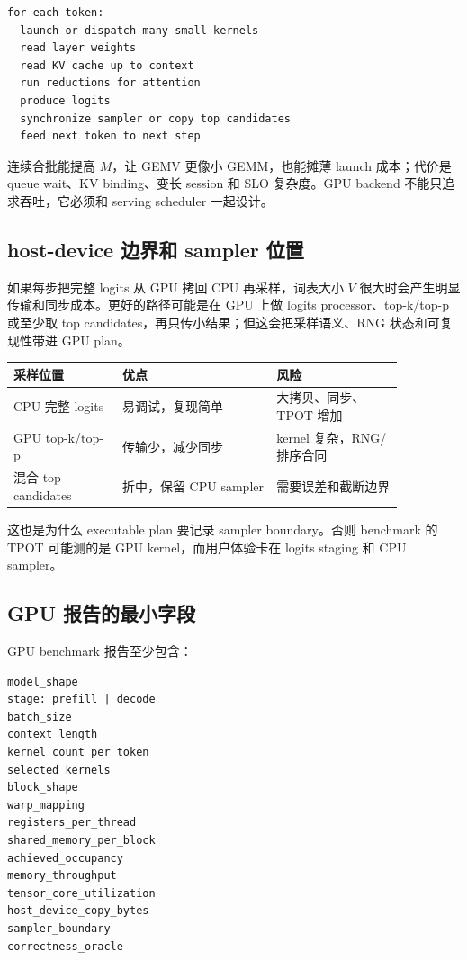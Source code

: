 \begin{lstlisting}[numbers=none,caption={单 session decode 的 GPU 固定成本}]
for each token:
  launch or dispatch many small kernels
  read layer weights
  read KV cache up to context
  run reductions for attention
  produce logits
  synchronize sampler or copy top candidates
  feed next token to next step
\end{lstlisting}

连续合批能提高 \(M\)，让 GEMV 更像小 GEMM，也能摊薄 launch 成本；代价是 queue wait、KV binding、变长 session 和 SLO 复杂度。GPU backend 不能只追求吞吐，它必须和 serving scheduler 一起设计。

\subsection{host-device 边界和 sampler 位置}

如果每步把完整 logits 从 GPU 拷回 CPU 再采样，词表大小 \(V\) 很大时会产生明显传输和同步成本。更好的路径可能是在 GPU 上做 logits processor、top-k/top-p 或至少取 top candidates，再只传小结果；但这会把采样语义、RNG 状态和可复现性带进 GPU plan。

\begin{center}
\begin{tabular}{p{0.24\linewidth}p{0.34\linewidth}p{0.28\linewidth}}
\toprule
采样位置 & 优点 & 风险 \\
\midrule
CPU 完整 logits & 易调试，复现简单 & 大拷贝、同步、TPOT 增加 \\
GPU top-k/top-p & 传输少，减少同步 & kernel 复杂，RNG/排序合同 \\
混合 top candidates & 折中，保留 CPU sampler & 需要误差和截断边界 \\
\bottomrule
\end{tabular}
\end{center}

这也是为什么 executable plan 要记录 sampler boundary。否则 benchmark 的 TPOT 可能测的是 GPU kernel，而用户体验卡在 logits staging 和 CPU sampler。

\subsection{GPU 报告的最小字段}

GPU benchmark 报告至少包含：

\begin{lstlisting}[numbers=none,caption={GPU backend report 最小字段}]
model_shape
stage: prefill | decode
batch_size
context_length
kernel_count_per_token
selected_kernels
block_shape
warp_mapping
registers_per_thread
shared_memory_per_block
achieved_occupancy
memory_throughput
tensor_core_utilization
host_device_copy_bytes
sampler_boundary
correctness_oracle
\end{lstlisting}

